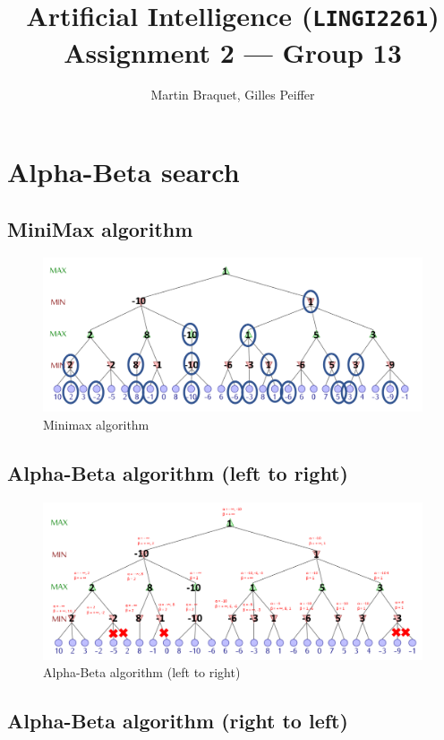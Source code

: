 \documentclass[en]{article}
\title{Artificial Intelligence (\texttt{LINGI2261}) \\ Assignment 2 --- Group 13}
\author{Martin Braquet, Gilles Peiffer}
\begin{document}
\maketitle

\section{Alpha-Beta search}

\subsection{MiniMax algorithm}

\begin{figure}[H]
 \centering
 \includegraphics[width=\textwidth]{MiniMax.png}
 \caption{Minimax algorithm}
 \label{fig:minimax}
\end{figure}


\subsection{Alpha-Beta algorithm (left to right)}

\begin{figure}[H]
 \centering
 \includegraphics[width=\textwidth]{Alphabeta.png}
 \caption{Alpha-Beta algorithm (left to right)}
 \label{fig:alphabeta}
\end{figure}


\subsection{Alpha-Beta algorithm (right to left)}
\end{document}

